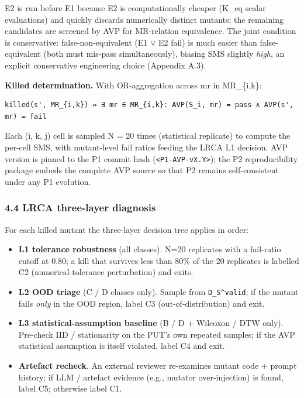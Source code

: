 \documentclass[review,12pt,authoryear]{elsarticle}
\providecommand{\tightlist}{\setlength{\itemsep}{0pt}\setlength{\parskip}{0pt}}
\begin{document}
E2 is run before E1 because E2 is computationally cheaper (K\_eq scalar
evaluations) and quickly discards numerically distinct mutants; the
remaining candidates are screened by AVP for MR-relation equivalence.
The joint condition is conservative: false-non-equivalent (E1 $\vee$ E2 fail)
is much easier than false-equivalent (both must mis-pass
simultaneously), biasing SMS slightly \emph{high}, an explicit
conservative engineering choice (Appendix A.3).

\textbf{Killed determination.} With OR-aggregation across mr in
MR\_\{i,k\}:

\begin{verbatim}
killed(s', MR_{i,k}) ⇔ ∃ mr ∈ MR_{i,k}: AVP(S_i, mr) = pass ∧ AVP(s', mr) = fail
\end{verbatim}

Each (i, k, j) cell is sampled N = 20 times (statistical replicate) to
compute the per-cell SMS, with mutant-level fail ratios feeding the LRCA
L1 decision. AVP version is pinned to the P1 commit hash
(\texttt{\textless{}P1-AVP-vX.Y\textgreater{}}); the P2 reproducibility
package embeds the complete AVP source so that P2 remains
self-consistent under any P1 evolution.

\subsubsection{4.4 LRCA three-layer
diagnosis}\label{lrca-three-layer-diagnosis}

For each killed mutant the three-layer decision tree applies in order:

\begin{itemize}
\tightlist
\item
  \textbf{L1 tolerance robustness} (all classes). N=20 replicates with a
  fail-ratio cutoff at 0.80; a kill that survives less than 80\% of the
  20 replicates is labelled C2 (numerical-tolerance perturbation) and
  exits.
\item
  \textbf{L2 OOD triage} (C / D classes only). Sample from
  \texttt{D\_S\^{}valid}; if the mutant fails \emph{only} in the OOD
  region, label C3 (out-of-distribution) and exit.
\item
  \textbf{L3 statistical-assumption baseline} (B / D + Wilcoxon / DTW
  only). Pre-check IID / stationarity on the PUT's own repeated samples;
  if the AVP statistical assumption is itself violated, label C4 and
  exit.
\item
  \textbf{Artefact recheck}. An external reviewer re-examines mutant
  code + prompt history; if LLM / artefact evidence (e.g., mutator
  over-injection) is found, label C5; otherwise label C1.
\end{itemize}
\end{document}
